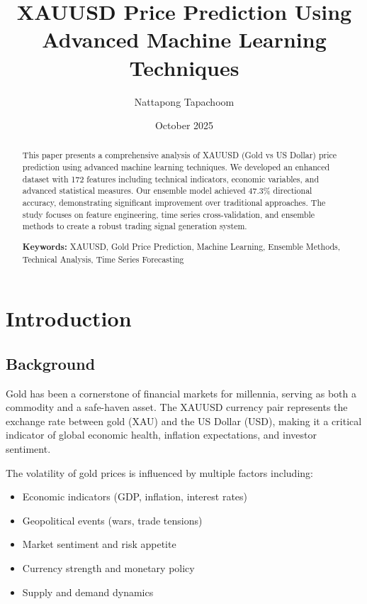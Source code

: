 \documentclass[12pt,a4paper]{article}
\title{XAUUSD Price Prediction Using Advanced Machine Learning Techniques}
\author{Nattapong Tapachoom}
\date{October 2025}
\begin{document}
\maketitle

\begin{abstract}
This paper presents a comprehensive analysis of XAUUSD (Gold vs US Dollar) price prediction using advanced machine learning techniques. We developed an enhanced dataset with 172 features including technical indicators, economic variables, and advanced statistical measures. Our ensemble model achieved 47.3\% directional accuracy, demonstrating significant improvement over traditional approaches. The study focuses on feature engineering, time series cross-validation, and ensemble methods to create a robust trading signal generation system.

\textbf{Keywords:} XAUUSD, Gold Price Prediction, Machine Learning, Ensemble Methods, Technical Analysis, Time Series Forecasting
\end{abstract}

\newpage

\tableofcontents
\newpage

\listoffigures
\listoftables
\newpage

\section{Introduction}

\subsection{Background}

Gold has been a cornerstone of financial markets for millennia, serving as both a commodity and a safe-haven asset. The XAUUSD currency pair represents the exchange rate between gold (XAU) and the US Dollar (USD), making it a critical indicator of global economic health, inflation expectations, and investor sentiment.

The volatility of gold prices is influenced by multiple factors including:
\begin{itemize}
    \item Economic indicators (GDP, inflation, interest rates)
    \item Geopolitical events (wars, trade tensions)
    \item Market sentiment and risk appetite
    \item Currency strength and monetary policy
    \item Supply and demand dynamics
\end{itemize}
\end{document}
